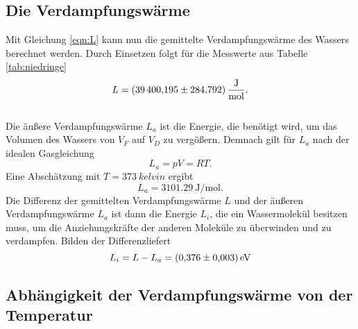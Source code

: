 \subsection{Die Verdampfungswärme}
Mit Gleichung \eqref{eqn:L} kann nun die gemittelte Verdampfungswärme des Wassers berechnet werden.
Durch Einsetzen folgt für die Messwerte aus Tabelle \ref{tab:niedringe}
\begin{equation}
  L=\SI{39400.195\pm284.792}{\joule\per\mole}.
\end{equation}
\\
Die äußere Verdampfungswärme $L_a$ ist die Energie, die benötigt wird, um das Volumen des Wassers von
$V_F$ auf $V_D$ zu vergößern. Demnach gilt für $L_a$ nach der idealen Gasgleichung
\begin{equation}
  L_a=pV=RT.
\end{equation}
Eine Abschätzung mit $T=\SI{373}{kelvin}$ ergibt
\begin{equation}
  L_a=\SI{3101.29}{\joule\per\mole}.
\end{equation}
Die Differenz der gemittelten Verdampfungswärme $L$ und der äußeren Verdampfungswärme $L_a$ ist dann 
die Energie $L_i$, die ein Wassermolekül besitzen muss, um die Anziehungskräfte der anderen Moleküle zu überwinden
und zu verdampfen. Bilden der Differenzliefert
\begin{equation}
  L_i=L-L_a=\SI{0.376 \pm 0.003}{\electronvolt}
\end{equation}

\subsection{Abhängigkeit der Verdampfungswärme von der Temperatur}